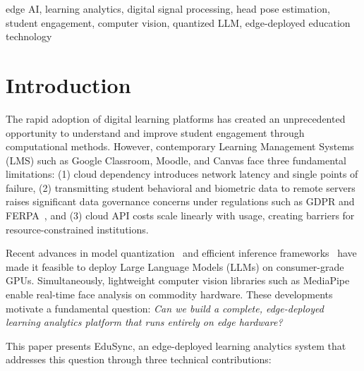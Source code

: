 \documentclass[conference]{IEEEtran}
\begin{document}
\begin{IEEEkeywords}
edge AI, learning analytics, digital signal processing, head pose estimation, student engagement, computer vision, quantized LLM, edge-deployed education technology
\end{IEEEkeywords}

\section{Introduction}

The rapid adoption of digital learning platforms has created an unprecedented opportunity to understand and improve student engagement through computational methods. However, contemporary Learning Management Systems (LMS) such as Google Classroom, Moodle, and Canvas face three fundamental limitations: (1) cloud dependency introduces network latency and single points of failure, (2) transmitting student behavioral and biometric data to remote servers raises significant data governance concerns under regulations such as GDPR and FERPA~\cite{gdpr2016, ferpa1974}, and (3) cloud API costs scale linearly with usage, creating barriers for resource-constrained institutions.

Recent advances in model quantization~\cite{dettmers2022gptint, frantar2023gptq} and efficient inference frameworks~\cite{gerganov2023llamacpp} have made it feasible to deploy Large Language Models (LLMs) on consumer-grade GPUs. Simultaneously, lightweight computer vision libraries such as MediaPipe~\cite{lugaresi2019mediapipe} enable real-time face analysis on commodity hardware. These developments motivate a fundamental question: \textit{Can we build a complete, edge-deployed learning analytics platform that runs entirely on edge hardware?}

This paper presents EduSync, an edge-deployed learning analytics system that addresses this question through three technical contributions:
\end{document}
